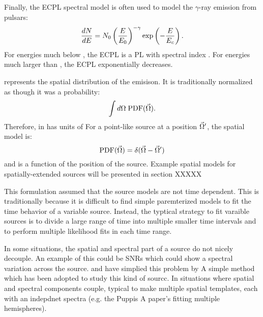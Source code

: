 Finally, the \ac{ECPL} spectral model is often
used to model the $\gamma$-ray emission from pulsars:
\begin{equation}
  \frac{dN}{dE} = N_0 \left(\frac{E}{E_0}\right)^{-\gamma}
  \exp\left(-\frac{E}{E_c}\right).
\end{equation}
For energies much below \Ecutoff, 
the \ac{ECPL} is a \ac{PL} with spectral index \spectralindex.
For energies much larger than \Ecutoff, the \ac{ECPL}
exponentially decreases.

\pdf represents the spatial distribution of the emisison.
It is traditionally normalized as though it was a probability:
  \begin{equation}
    \int d\Omega \; \text{PDF}(\vec\Omega).
  \end{equation}
Therefore, in  \pdf has units of \pdfunits
For a point-like source at a position $\vec\Omega'$, the spatial model is:
  \begin{equation}
    \text{PDF}(\vec\Omega) = \delta(\vec\Omega - \vec\Omega')
  \end{equation}
and is a function of the position of the source.
Example spatial models for spatially-extended sources will be presented
in section XXXXX


This formulation assumed that the source models are not time dependent.
This is traditionally because it is difficult to find simple paremterized
models to fit the time behavior of a variable source. Instead, the typtical
strategy to fit varaible sources is to divide a large range of time
into multiple smaller time intervals 
and to perform multiple likelihood fits in each time range.

In some situations, the spatial and spectral part of a source do not nicely decouple.
An example of this could be \acp{SNR} which could show a spectral variation
across the source. 
\cite{katsuta_2012_fermi-lat-observation} and \cite{hewitt_2012_fermi-lat-observations} have
simplied this problem by
A simple method which has been adopted to study
this kind of sourcc. 
In situations where spatial and spectral components couple, typical to make
multiple spatial templates, each with an indepdnet spectra (e.g. the Puppis A paper's
fitting multiple hemispheres).

